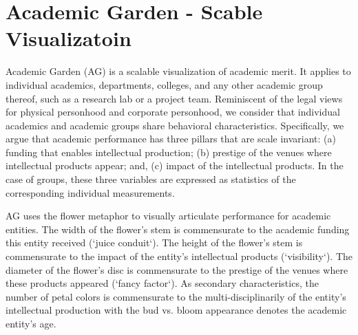 \section {Academic Garden - Scable Visualizatoin}
Academic Garden (AG) is a scalable visualization of academic merit. It applies to individual academics, departments, colleges, and any other academic group thereof, such as a research lab or a project team. Reminiscent of the legal views for physical personhood and corporate personhood, we consider that individual academics and academic groups share behavioral characteristics. Specifically, we argue that academic performance has three pillars that are scale invariant: (a) funding that enables intellectual production; (b) prestige of the venues where intellectual products appear; and, (c) impact of the intellectual products. In the case of groups, these three variables are expressed as statistics of the corresponding individual measurements.

AG uses the flower metaphor to visually articulate performance for academic entities. The width of the flower's stem is commensurate to the academic funding this entity received (`juice conduit`). The height of the flower's stem is commensurate to the impact of the entity's intellectual products (`visibility`). The diameter of the flower's disc is commensurate to the prestige of the venues where these products appeared (`fancy factor`). As secondary characteristics, the number of petal colors is commensurate to the multi-disciplinarily of the entity's intellectual production with the bud vs. bloom appearance denotes the academic entity's age.

